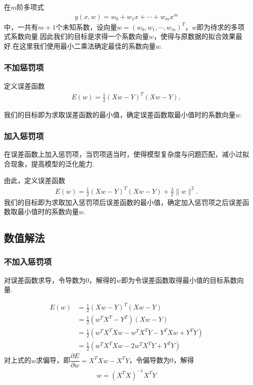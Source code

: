 \documentclass{hitreport}
\begin{document}
在$m$阶多项式
\begin{align}
y\left(x,w\right) = w_0+w_1x+\cdots+w_mx^m
\end{align}
中，一共有$m+1$个未知系数，设向量$w=\left(w_0,w_1,\cdots ,w_m\right)^T$，$w$即为待求的多项式系数向量.因此我们的目标是求得一个系数向量$w$，使得与原数据的拟合效果最好.在这里我们使用最小二乘法确定最佳的系数向量$w$.

\subsubsection{不加惩罚项}
定义误差函数
\begin{align}
E\left(w\right) = \frac {1}{2} \left(Xw-Y\right)^{T}\left(Xw-Y\right),
\end{align}

我们的目标即为求取误差函数的最小值，确定误差函数取最小值时的系数向量$w$.

\subsubsection{加入惩罚项}

在误差函数上加入惩罚项，当罚项适当时，使得模型复杂度与问题匹配，减小过拟合现象，提高模型的泛化能力.

由此，定义误差函数
\begin{align}\label{equ:withlam}
E\left(w\right) = \frac {1}{2} \left(Xw-Y\right)^{T}\left(Xw-Y\right) + \frac{\lambda}{2} \lVert w \rVert^{2}.
\end{align}
我们的目标即为求取加入惩罚项后误差函数的最小值，确定加入惩罚项之后误差函数取最小值时的系数向量$w$.

\subsection{数值解法}\label{sec:analystical}

\subsubsection{不加入惩罚项}

对误差函数求导，令导数为0，解得的$w$即为令误差函数取得最小值的目标系数向量.

\begin{align}
E\left( w \right)&=\frac{1}{2}\left( Xw-Y \right) ^T\left( Xw-Y \right)\\
	&=\frac{1}{2}\left( w^TX^T-Y^T \right) \left( Xw-Y \right)\\
	&=\frac{1}{2}\left( w^TX^TXw-w^TX^TY-Y^TXw+Y^TY \right)\\
	&=\frac{1}{2}\left( w^TX^TXw-2w^TX^TY+Y^TY \right)
\end{align}
对上式的$w$求偏导，即$\dfrac{\partial E}{\partial w} = X^{T}Xw-X^{T}Y$，令偏导数为0，解得
\begin{align}
w = \left(X^{T}X\right)^{-1}X^{T}Y
\end{align}
\end{document}
